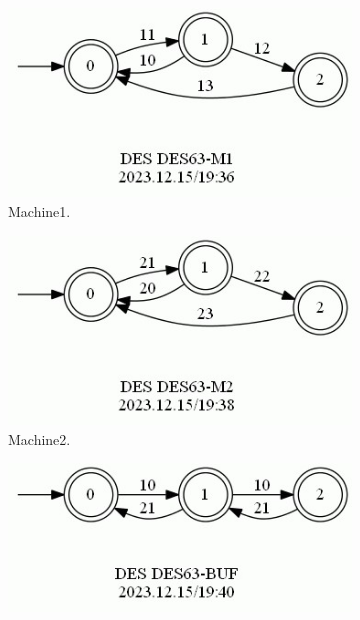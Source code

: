 \documentclass{article}
\begin{document}
\begin{figure}[h!]
  \centering
  \begin{subfigure}{0.26\linewidth}
    \includegraphics[width=\linewidth]{assets/DES63-M1.jpg}
     \caption{Machine1.}
  \end{subfigure}
  \begin{subfigure}{0.26\linewidth}
    \includegraphics[width=\linewidth]{assets/DES63-M2.jpg}
     \caption{Machine2.}
  \end{subfigure}
  \begin{subfigure}{0.26\linewidth}
    \includegraphics[width=\linewidth]{assets/DES63-BUF.jpg}

\end{subfigure}
\end{figure}
\end{document}
